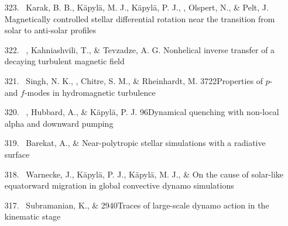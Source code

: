 \begin{itemize}
\item[{323.}~]
Karak, B. B., K\"apyl\"a, M. J., K\"apyl\"a, P. J., \Brandenburg, Olspert, N., \& Pelt, J.
{Magnetically controlled stellar differential rotation near the transition from solar to anti-solar profiles}

\item[{322.}~]
\Brandenburg, Kahniashvili, T., \& Tevzadze, A. G.
{Nonhelical inverse transfer of a decaying turbulent magnetic field}

\item[{321.}~]
Singh, N. K., \Brandenburg, Chitre, S. M., \& Rheinhardt, M.
{3722}{Properties of $p$- and $f$-modes in hydromagnetic turbulence}

\item[{320.}~]
\Brandenburg, Hubbard, A., \& K\"apyl\"a, P. J.
{96}{Dynamical quenching with non-local alpha and downward pumping}

\item[{319.}~]
Barekat, A., \& \Brandenburg{}
{Near-polytropic stellar simulations with a radiative surface}

\item[{318.}~]
Warnecke, J., K\"apyl\"a, P. J., K\"apyl\"a, M. J., \& \Brandenburg{}
{On the cause of solar-like equatorward migration in global convective dynamo simulations}

\item[{317.}~]
Subramanian, K., \& \Brandenburg{}
{2940}{Traces of large-scale dynamo action in the kinematic stage}


\end{itemize}
